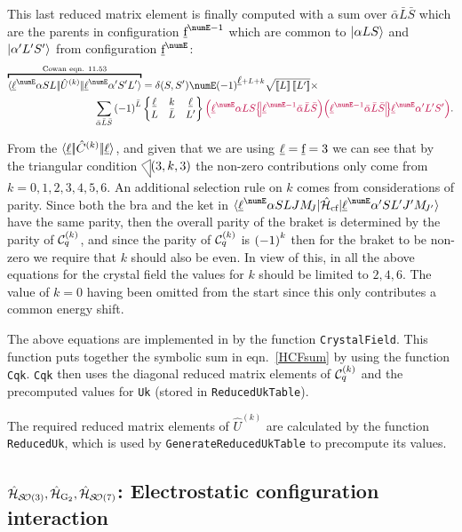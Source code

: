 \documentclass{article}
\newcommand{\codetext}[1]{{\color{BlueViolet} \texttt{#1}}}
\begin{document}
This last reduced matrix element is finally computed with a sum over $\bar{\alpha}\bar{L}\bar{S}$ which are the parents in configuration $\forb^{\numE-1}$ which are common to $|\alpha L S\rangle$ and $|\alpha' L' S'\rangle$ from configuration $\forb^{\numE}$:
\begin{align}
\overbracket{\redbraopket{\lorb^\numE \alpha S L} 
    {\op{U}^{(k)}}
    {\lorb^\numE \alpha' S' L'}}^{\text{Cowan eqn. 11.53}} &= \kronecker{S}{S'} \numE \phaser{\lorb + L + k}
         \sqrt{\tpobraket{L}\tpobraket{L'}} \times \\
\nonumber \sum_{\bar{\alpha}\bar{L}\bar{S}} 
    \phaser{\bar{L}} & \sixj{\lorb}{k}{\lorb}{L}{\bar{L}}{L'}
    \cfpinv{\lorb^\numE \alpha L S}
        {\lorb^{\numE - 1}\bar{\alpha}\bar{L}\bar{S}}
    \cfp{\lorb^{\numE -1}\bar{\alpha}\bar{L}\bar{S}}{\lorb^\numE\alpha'L'S'}.
\end{align}

From the $\langle \underbar{$\ell$}|\!|\hat{C}^{(k)}|\!|\underbar{$\ell$}\rangle$, and given that we are using $\underbar{$\ell$} = \underbar{$\text{f}$} = 3$ we can see that by the triangular condition $\tricondition{3,k,3}$ the non-zero contributions only come from $k=0,1,2,3,4,5,6$. An additional selection rule on $k$ comes from considerations of parity. Since both the bra and the ket in $\braopket{\lorb^\numE \alpha SLJ \Msub{J}}{\hamCrystalFieldSymbol}{\lorb^\numE \alpha'S L' J' \Msub{J'}}$ have the same parity, then the overall parity of the braket is determined by the parity of $\mathcal{C}^{(k)}_q$, and since the parity of $\mathcal{C}^{(k)}_q$ is ${(-1)}^{k}$ then for the braket to be non-zero we require that $k$ should also be even. In view of this, in all the above equations for the crystal field the values for $k$ should be limited to $2,4,6$. The value of $k=0$ having been omitted from the start since this only contributes a common energy shift.

The above equations are implemented in \qlanth by the function \codetext{CrystalField}. This function puts together the symbolic sum in eqn.~\eqref{HCFsum} by using the function \codetext{Cqk}. \codetext{Cqk} then uses the diagonal reduced matrix elements of $\mathcal{C}^{(k)}_q$ and the precomputed values for \codetext{Uk} (stored in \codetext{ReducedUkTable}).

The required reduced matrix elements of $\hat{U}^{(k)}$ are calculated by the function \codetext{ReducedUk}, which is used by \codetext{GenerateReducedUkTable} to precompute its values.

\subsection{$\hat{\mathcal{H}}_{\mathcal{S\!O}(3)}, \hat{\mathcal{H}}_{\text{G}_2}, \hat{\mathcal{H}}_{\mathcal{S\!O}(7)}$: Electrostatic configuration interaction}
\end{document}
